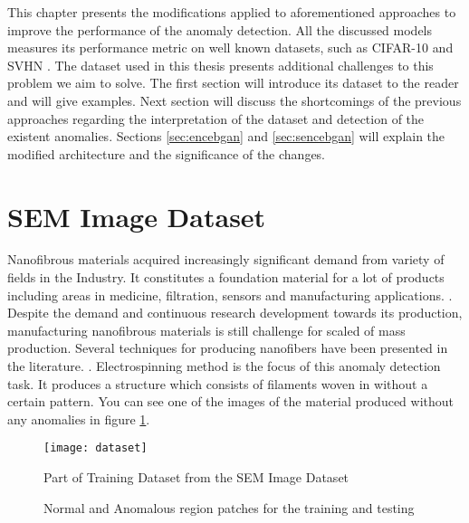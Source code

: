 
\begingroup

This chapter presents the modifications applied to aforementioned approaches to improve the performance of the anomaly detection. All the discussed models measures its performance metric on well known datasets, such as CIFAR-10 \cite{cifar10} and SVHN \cite{Netzer2011ReadingDI}. The dataset used in this thesis presents additional challenges to this problem we aim to solve. The first section will introduce its dataset to the reader and will give examples. Next section will discuss the shortcomings of the previous approaches regarding the interpretation of the dataset and detection of the existent anomalies. Sections \ref{sec:encebgan} and \ref{sec:sencebgan} will explain the modified architecture and the significance of the changes.

\section{SEM Image Dataset}
\label{sec:sem}

Nanofibrous materials acquired increasingly significant demand from variety of fields in the Industry. It constitutes a foundation material for a lot of products including areas in medicine, filtration, sensors and manufacturing applications. \cite{carrera2016defect}. Despite the demand and continuous research development towards its production, manufacturing nanofibrous materials is still  challenge for scaled of mass production. Several techniques for producing nanofibers have been presented in the literature. \cite{carrera2016defect}. Electrospinning method is the focus of this anomaly detection task. It produces a structure which consists of filaments woven in without a certain pattern.  You can see one of the images of the material produced without any anomalies in figure \ref{fig:data_norm}.

\begin{figure}[h!]
	\centering
	\texttt{[image: dataset]}
	\caption{Part of Training Dataset from the SEM Image Dataset \cite{sem}}
	\label{fig:data_norm}
\end{figure}


\begin{figure}[h!] 
	\hfill 	
	\caption{Normal and Anomalous region patches for the training and testing}
	\label{fig:data_samples}
\end{figure}

